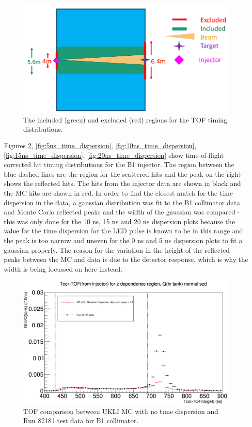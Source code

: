 \begin{figure}
    \centering
    \includegraphics[width=\textwidth]{Figures/exclusion_region.PNG}
    \caption{The included (green) and excluded (red) regions for the TOF timing distributions.}
    \label{fig:exclusion_region}
\end{figure}

Figures \ref{fig:0ns_time_dispersion}, \ref{fig:5ns_time_dispersion}, \ref{fig:10ns_time_dispersion}, \ref{fig:15ns_time_dispersion}, \ref{fig:20ns_time_dispersion} show time-of-flight corrected hit timing distributions for the B1 injector. The region between the blue dashed lines are the region for the scattered hits and the peak on the right shows the reflected hits. The hits from the injector data are shown in black and the MC hits are shown in red. In order to find the closest match for the time dispersion in the data, a gaussian distribution was fit to the B1 collimator data and Monte Carlo reflected peaks and the width of the gaussian was compared - this was only done for the 10 ns, 15 ns and 20 ns dispersion plots because the value for the time dispersion for the LED pulse is known to be in this range and the peak is too narrow and uneven for the 0 ns and 5 ns dispersion plots to fit a gaussian properly. The reason for the variation in the height of the reflected peaks between the MC and data is due to the detector response, which is why the width is being focussed on here instead.

\begin{figure}
    \centering
    \includegraphics[width=\textwidth]{Figures/0ns_gaussian_dispersion_comparison.jpg}
    \caption{TOF comparison between UKLI MC with no time dispersion and Run 82181 test data for B1 collimator.}
    \label{fig:0ns_time_dispersion}
\end{figure}

